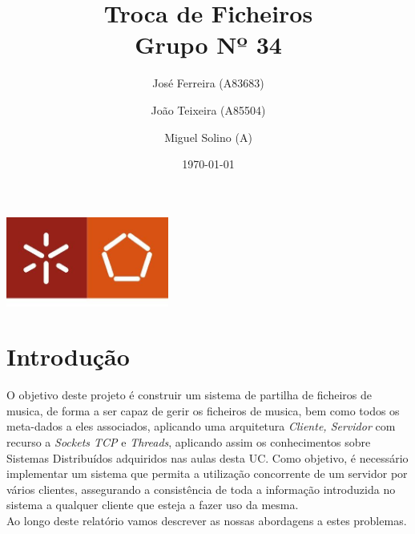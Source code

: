 \documentclass[a4paper]{report}
\begin{document}
\title{Troca de Ficheiros\\ 
\large Grupo Nº 34}
\author{José Ferreira (A83683) \and João Teixeira (A85504) \and Miguel Solino (A)}
\date{\today}

\begin{center}
    \begin{minipage}{0.75\linewidth}
        \centering
        \includegraphics[width=0.4\textwidth]{eng.jpeg}\par\vspace{1cm}
        \vspace{1.5cm}
        \href{https://www.uminho.pt/PT}
        {\color{black}{\scshape\LARGE Universidade do Minho}} \par
        \vspace{1cm}
        \href{https://www.di.uminho.pt/}
        {\color{black}{\scshape\Large Departamento de Informática}} \par
        \vspace{1.5cm}
        \maketitle
    \end{minipage}
\end{center}

\tableofcontents

\pagebreak
\chapter{Introdução}
O objetivo deste projeto é construir um sistema de partilha de ficheiros de 
musica, de forma a ser capaz de gerir os ficheiros de musica, bem como todos
os meta-dados a eles associados, aplicando uma arquitetura 
\textit{Cliente, Servidor} com recurso a \textit{Sockets TCP} e \textit{Threads},
aplicando assim os conhecimentos sobre Sistemas Distribuídos adquiridos nas 
aulas desta UC\@.
Como objetivo, é necessário implementar um sistema que permita a utilização 
concorrente de um servidor por vários clientes, assegurando a consistência
de toda a informação introduzida no sistema a qualquer cliente que esteja
a fazer uso da mesma.\\
Ao longo deste relatório vamos descrever as nossas abordagens a estes problemas.
\end{document}
